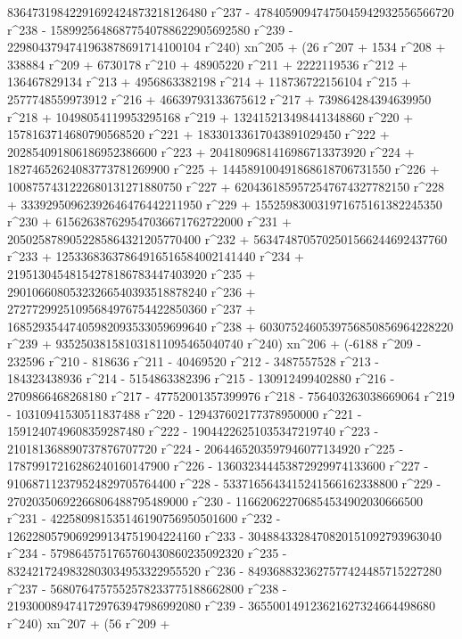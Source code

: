        83647319842291692424873218126480 r^237 - 
       47840590947475045942932556566720 r^238 - 
       15899256486877540788622905692580 r^239 - 
       2298043794741963878691714100104 r^240) xn^205 + (26 r^207 + 
       1534 r^208 + 338884 r^209 + 6730178 r^210 + 48905220 r^211 + 
       2222119536 r^212 + 136467829134 r^213 + 4956863382198 r^214 + 
       118736722156104 r^215 + 2577748559973912 r^216 + 
       46639793133675612 r^217 + 739864284394639950 r^218 + 
       10498054119953295168 r^219 + 132415213498441348860 r^220 + 
       1578163714680790568520 r^221 + 18330133617043891029450 r^222 + 
       202854091806186952386600 r^223 + 
       2041809681416986713373920 r^224 + 
       18274652624083773781269900 r^225 + 
       144589100491868618706731550 r^226 + 
       1008757431222680131271880750 r^227 + 
       6204361859572547674327782150 r^228 + 
       33392950962392646476442211950 r^229 + 
       155259830031971675161382245350 r^230 + 
       615626387629547036671762722000 r^231 + 
       2050258789052285864321205770400 r^232 + 
       5634748705702501566244692437760 r^233 + 
       12533683637864916516584002141440 r^234 + 
       21951304548154278186783447403920 r^235 + 
       29010660805323266540393518878240 r^236 + 
       27277299251095684976754422850360 r^237 + 
       16852935447405982093533059699640 r^238 + 
       6030752460539756850856964228220 r^239 + 
       935250381581031811095465040740 r^240) xn^206 + (-6188 r^209 - 
       232596 r^210 - 818636 r^211 - 40469520 r^212 - 
       3487557528 r^213 - 184323438936 r^214 - 5154863382396 r^215 - 
       130912499402880 r^216 - 2709866468268180 r^217 - 
       47752001357399976 r^218 - 756403263038669064 r^219 - 
       10310941530511837488 r^220 - 129437602177378950000 r^221 - 
       1591240749608359287480 r^222 - 19044226251035347219740 r^223 - 
       210181368890737876707720 r^224 - 
       2064465203597946077134920 r^225 - 
       17879917216286240160147900 r^226 - 
       136032344453872929974133600 r^227 - 
       910687112379524829705764400 r^228 - 
       5337165643415241566162338800 r^229 - 
       27020350692266806488795489000 r^230 - 
       116620622706854534902030666500 r^231 - 
       422580981535146190756950501600 r^232 - 
       1262280579069299134751904224160 r^233 - 
       3048843328470820151092793963040 r^234 - 
       5798645751765760430860235092320 r^235 - 
       8324217249832803034953322955520 r^236 - 
       8493688323627577424485715227280 r^237 - 
       5680764757552578233775188662800 r^238 - 
       2193000894741729763947986992080 r^239 - 
       365500149123621627324664498680 r^240) xn^207 + (56 r^209 + 
